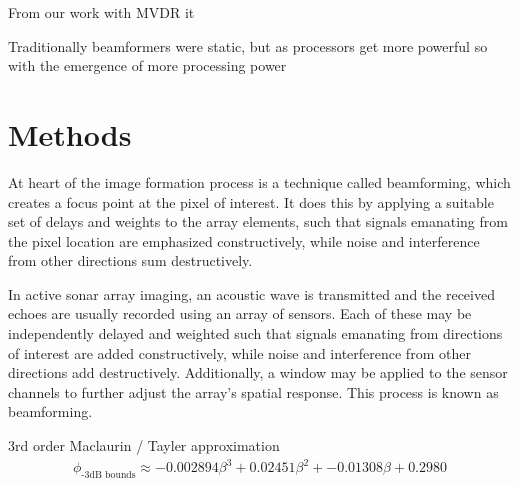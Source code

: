 \documentclass[10pt,journal,draftclsnofoot,onecolumn]{IEEEtran}
\newcommand\1{\vec 1}
\begin{document}
% 
% 


From our work with MVDR it 


Traditionally beamformers were static, but as processors get more powerful so with the emergence of more processing power 



\section{Methods}

At heart of the image formation process is a technique called beamforming, which creates a focus point at the pixel of interest. It does this by applying a suitable set of delays and weights to the array elements, such that signals emanating from the pixel location are emphasized constructively, while noise and interference from other directions sum destructively.

In active sonar array imaging, an acoustic wave is transmitted and the received echoes are usually recorded using an array of sensors. Each of these may be independently delayed and weighted such that signals emanating from directions of interest are added constructively, while noise and interference from other directions add destructively. Additionally, a window may be applied to the sensor channels to further adjust the array's spatial response. This process is known as beamforming.%

3rd order Maclaurin / Tayler approximation
\begin{align}
\phi_\text{-3dB bounds} \approx -0.002894\beta^3 + 0.02451\beta^2 + -0.01308\beta + 0.2980
\end{align}



\end{document}

